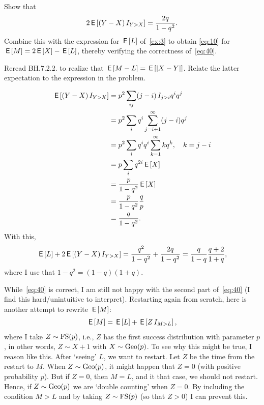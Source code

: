 \documentclass[a4paper,11pt]{article}
\begin{document}
\begin{exercise}\label{ex:9}
Show that
\begin{equation}
  \label{eq:41}
2\,\mathsf{E}\left[(Y-X) \,I_{Y>X}\right] = \frac{2q} {1-q^{2}}.
\end{equation}
Combine this with the expression for $\,\mathsf{E}\left[L\right]$ of~\cref{ex:3} to obtain \cref{eq:10} for $\,\mathsf{E}\left[M\right] = 2\,\mathsf{E}\left[X\right] - \,\mathsf{E}\left[L\right]$, thereby verifying the correctness of~\cref{eq:40}.
\begin{hint}
  Reread BH.7.2.2. to realize that $\,\mathsf{E}\left[M-L\right] = \,\mathsf{E}\left[|X-Y|\right]$. Relate the latter expectation to the expression in the problem.
\end{hint}
\begin{solution}
  \begin{align}
    \label{eq:42}
\,\mathsf{E}\left[(Y-X) \,I_{Y>X}\right]
&= p^2\sum_{ij} (j-i)\,I_{j>i} q^iq^j\\
&= p^2\sum_{i} q^i\sum_{j=i+1}^{\infty}(j-i)q^j\\
&= p^2\sum_{i} q^i q^{i}\sum_{k=1}^{\infty}kq^k, \quad k = j-i\\
&= p\sum_{i}  q^{2i}\,\mathsf{E}\left[X\right] \\
&= \frac{p}{1-q^{2}}\,\mathsf{E}\left[X\right] \\
&= \frac{p}{1-q^{2}}\frac q p \\
&= \frac{q}{1-q^{2}}.
  \end{align}
With this,
\begin{align}
  \label{eq:43}
\,\mathsf{E}\left[L\right] + 2  \,\mathsf{E}\left[(Y-X) \,I_{Y>X}\right] = \frac{q^{2}}{1-q^2} +  \frac{2q}{1-q^{2}} = \frac q{1-q}\frac{q+2}{1+q},
\end{align}
where I use that $1-q^{2}=(1-q)(1+q)$.
\end{solution}
\end{exercise}

While~\cref{eq:40} is correct, I am still not happy with the second part of~\eqref{eq:40} (I find this hard/unintuitive to interpret).
Restarting again from scratch, here is another attempt to rewrite $\,\mathsf{E}\left[M\right]$:
\begin{align}
  \label{eq:44}
\,\mathsf{E}\left[M\right] = \,\mathsf{E}\left[L\right] + \,\mathsf{E}\left[ Z \,I_{M>L}\right],
\end{align}
where I take $Z\sim \mathrm{FS}(p)$, i.e., $Z$ has the first success distribution with parameter $p$, in other words, $Z \sim X+1$ with $X\sim\mathrm{Geo}(p)$.
To see why this might be true, I reason like this.
After `seeing' $L$, we want to restart.
Let $Z$ be the time from the restart to $M$.
When $Z\sim \mathrm{Geo}(p)$, it might happen that $Z=0$ (with positive probability $p$).
But if $Z=0$, then $M=L$, and it that case, we should not restart.
Hence, if $Z\sim \mathrm{Geo}(p)$ we are `double counting' when $Z=0$.
By including the condition $M>L$ and by taking $Z\sim\mathrm{FS}(p)$ (so that $Z>0$) I can prevent this.
\end{document}
